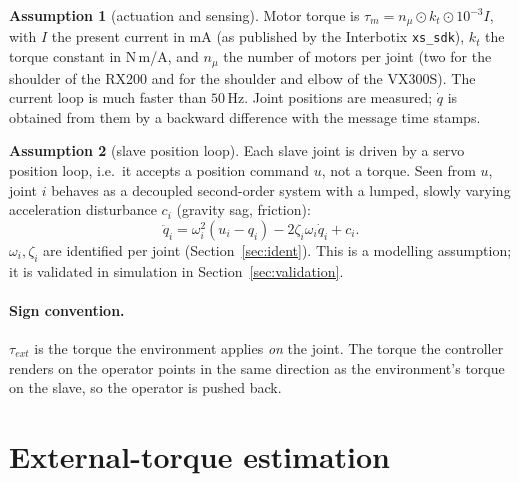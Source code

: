 \documentclass[11pt,a4paper]{article}
\theoremstyle{remark}
\theoremstyle{definition}
\newtheorem{assumption}{Assumption}
\begin{document}
\begin{assumption}[actuation and sensing]\label{as:act}
Motor torque is $\tau_m=n_\mu\odot k_t\odot10^{-3}I$, with $I$ the present current in mA (as published by the Interbotix \texttt{xs\_sdk}), $k_t$ the torque constant in N\,m/A,
and $n_\mu$ the number of motors per joint (two for the shoulder of the RX200 and for the shoulder and elbow of the VX300S). The current loop is much faster than $50$\,Hz.
Joint positions are measured; $\dot q$ is obtained from them by a backward difference with the message time stamps.
\end{assumption}

\begin{assumption}[slave position loop]\label{as:loop}
Each slave joint is driven by a servo position loop, i.e.\ it accepts a position command $u$, not a torque. Seen from $u$, joint $i$ behaves as a decoupled second-order system
with a lumped, slowly varying acceleration disturbance $c_i$ (gravity sag, friction):
\begin{equation}\label{eq:loop}
\ddot q_i=\omega_i^{2}(u_i-q_i)-2\zeta_i\omega_i\dot q_i+c_i .
\end{equation}
$\omega_i,\zeta_i$ are identified per joint (Section~\ref{sec:ident}). This is a modelling assumption; it is validated in simulation in Section~\ref{sec:validation}.
\end{assumption}

\paragraph{Sign convention.}
$\tau_{ext}$ is the torque the environment applies \emph{on} the joint. The torque the controller renders on the operator points in the same direction as the environment's torque on the slave,
so the operator is pushed back.

\section{External-torque estimation}\label{sec:obs}
\end{document}
